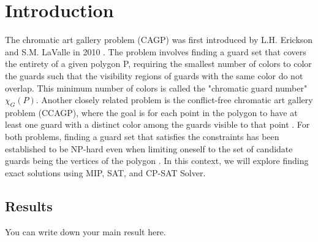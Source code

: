 \chapter{Introduction}
The chromatic art gallery problem (CAGP) was first introduced by L.H. Erickson and S.M. LaValle in 2010 \cite{erickson2010chromatic}. The problem involves finding a guard set that covers the entirety of a given polygon P, requiring the smallest number of colors to color the guards such that the visibility regions of guards with the same color do not overlap. This minimum number of colors is called the "chromatic guard number" $\chi_G(P)$. Another closely related problem is the conflict-free chromatic art gallery problem (CCAGP), where the goal is for each point in the polygon to have at least one guard with a distinct color among the guards visible to that point \cite{bartschi2014conflict}. For both problems, finding a guard set that satisfies the constraints has been established to be NP-hard even when limiting oneself to the set of candidate guards being the vertices of the polygon \cite{fekete2014chromatic}\cite{erickson2011many}\cite{iwamoto2022vertex}. In this context, we will explore finding exact solutions using MIP, SAT, and CP-SAT Solver.

\section{Results}
You can write down your main result here.

